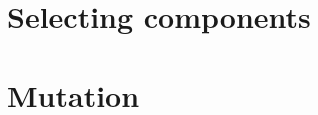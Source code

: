 \begin{comment}
## Pitch representations
-   The most important distinction is between *named* and *numbered* pitch
    objects.
-   All pitched score components (notes and chords) rely on *named*
    representations of pitch, not numbered
-   *Named* pitch objects are enharmonically explicit
-   *Numbered* pitch objects require some interpretation
-   Abjad has provided one interpretation, but that is for sufficiency
-   Abjad does *not* make smart guesses about converting numbered to named
    pitches
-   NamedPitch
-   NumberedPitch
-   NamedPitchClass
-   NumberedPitchClass
-   NamedInterval
-   NumberedInterval
-   NamedIntervalClass
-   NumberedIntervalClass
-   NamedInversionEquivalentIntervalClass
-   NumberedInversionEquivalentIntervalClass
## Pitch collections
-   Set, Segment, Vector
-   Pitch, PitchClass, Interval, IntervalClass
-   PitchSegment
-   PitchClassSegment
## Pitch operators
## Other pitch modeling concepts
-   Accidental
-   Octave
-   PitchRange
-   StaffPosition
## Inspecting leaf pitches
-   Note("c'4").written_pitch
-   Note("c'4").note_head.written_pitch
-   Chord("<c' e' g'>4").written_pitches
-   inspect_(note).get_sounding_pitch()
-   inspect_(note).get_sounding_pitches()
\end{comment}

\section{Selecting components}

\begin{comment}
## Indexing
-   By name
-   By index
-   By slice
## Selection
-   select()
-   Selection class
-   Container.select_leaves()
    -   allow_discontiguous_leaves=True
-   inspect_(...).get_logical_tie()
-   LogicalTie
    -   head
    -   tail
    -   timespan
    -   trivial logical ties
## Iteration
-   By __iter__()
-   By iterate(...)by_...()
    -   by_class()
    -   by_logical_tie()
    -   by_run()
    -   by_timeline()
    -   by_vertical_moment()
    -   depth_first()
## Selectors
-   Demonstrate a gallery of selectors.
    -   by duration
    -   by leaves
    -   by length
    -   by logical tie
    -   by counts (with negative counts too)
\end{comment}

\section{Mutation}

